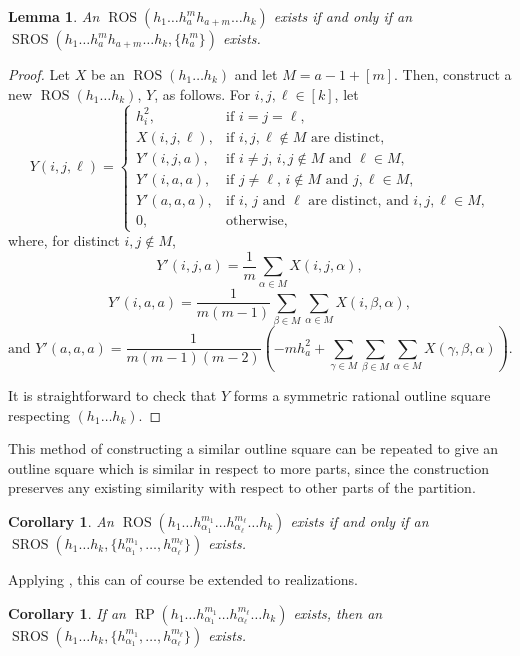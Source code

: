 \documentclass[preprint,nonatbib]{elsarticle}
\DeclareMathOperator{\LS}{RP}
\DeclareMathOperator{\ROS}{ROS}
\DeclareMathOperator{\SROS}{SROS}
\newtheorem{lemma}[theorem]{Lemma}
\newtheorem{corollary}[theorem]{Corollary}
\theoremstyle{definition}
\numberwithin{equation}{section}
\begin{document}
\begin{lemma}
    An $\ROS(h_1\dots h_a^m h_{a+m}\dots h_k)$ exists if and only if an $\SROS(h_1\dots h_a^m h_{a+m}\dots h_k,\{h_a^m\})$ exists.
\end{lemma}
\begin{proof}
    Let $X$ be an $\ROS(h_1\dots h_k)$ and let $M = a-1+[m]$. Then, construct a new $\ROS(h_1\dots h_k)$, $Y$, as follows.
    For $i,j,\ell\in [k]$, let
    $$Y(i,j,\ell) = \begin{cases}
        h_i^2, & \text{if $i=j=\ell$,}\\
        X(i,j,\ell), & \text{if $i,j,\ell\notin M$ are distinct,}\\
        Y'(i,j,a), & \text{if $i\neq j$, $i,j\notin M$ and $\ell\in M$,}\\
        Y'(i,a,a), & \text{if $j\neq \ell$, $i\notin M$ and $j,\ell\in M$,}\\
        Y'(a,a,a), & \text{if $i$, $j$ and $\ell$ are distinct, and $i,j,\ell\in M$,}\\
        0, & \text{otherwise,}
    \end{cases}$$
    where, for distinct $i,j\notin M$,
    $$Y'(i,j,a) = \frac{1}{m}\sum_{\alpha\in M} X(i,j,\alpha),$$
    $$Y'(i,a,a) = \frac{1}{m(m-1)}\sum_{\beta\in M}\sum_{\alpha\in M} X(i,\beta,\alpha),$$
    $$\text{and } Y'(a,a,a) = \frac{1}{m(m-1)(m-2)}\left(-mh_a^2+\sum_{\gamma\in M}\sum_{\beta\in M}\sum_{\alpha\in M} X(\gamma,\beta,\alpha)\right).$$

    It is straightforward to check that $Y$ forms a symmetric rational outline square respecting $(h_1\dots h_k)$.
\end{proof}

This method of constructing a similar outline square can be repeated to give an outline square which is similar in respect to more parts, since the construction preserves any existing similarity with respect to other parts of the partition.

\begin{corollary}
\label{cor: ROS iff SROS}
    An $\ROS(h_1\dots h_{\alpha_1}^{m_1}\dots h_{\alpha_\ell}^{m_\ell}\dots h_k)$ exists if and only if an $\SROS(h_1\dots h_k,\{h_{\alpha_1}^{m_1},\dots,h_{\alpha_\ell}^{m_\ell}\})$ exists.
\end{corollary}

Applying , this can of course be extended to realizations.

\begin{corollary}
    If an $\LS(h_1\dots h_{\alpha_1}^{m_1}\dots h_{\alpha_\ell}^{m_\ell}\dots h_k)$ exists, then an $\SROS(h_1\dots h_k,\{h_{\alpha_1}^{m_1},\dots,h_{\alpha_\ell}^{m_\ell}\})$ exists.
\end{corollary}
\end{document}
